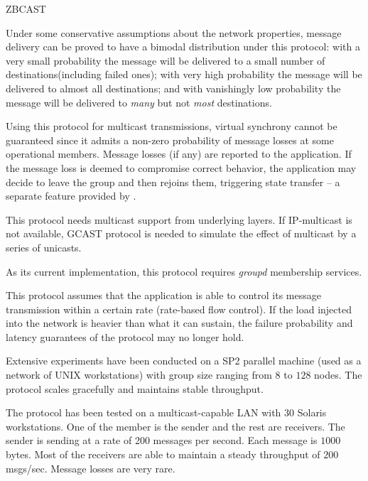 \begin{Layer}{ZBCAST}
\begin{Properties}
\item
Under some conservative assumptions about the network properties,
message delivery can be proved to have a bimodal distribution under
this protocol: with a very small probability the message will be
delivered to a small number of destinations(including failed ones);
with very high probability the message will be delivered to almost all
destinations; and with vanishingly low probability the message will be
delivered to \emph{many} but not \emph{most} destinations.

\item
Using this protocol for multicast transmissions, virtual synchrony
cannot be guaranteed since it admits a non-zero probability of message
losses at some operational members.  Message losses (if any) are
reported to the application.  If the message loss is deemed to
compromise correct behavior, the application may decide to leave the
group and then rejoins them, triggering state transfer -- a separate
feature provided by \ensemble.

\item
This protocol needs multicast support from underlying layers.  If
IP-multicast is not available, GCAST protocol is needed to simulate
the effect of multicast by a series of unicasts.

\item
As its current implementation, this protocol requires \emph{groupd}
membership services.

\item
This protocol assumes that the application is able to control its
message transmission within a certain rate (rate-based flow control).
If the load injected into the network is heavier than what it can
sustain, the failure probability and latency guarantees of the
protocol may no longer hold.
\end{Properties}

\begin{Sources}
\end{Sources}

\begin{GenEvent}
\genevent{\DnCast}
\genevent{\DnSend}
\genevent{\UpLostMessage}
\end{GenEvent}

\begin{Testing}
\item
Extensive experiments have been conducted on a SP2 parallel machine
(used as a network of UNIX workstations) with group size ranging from
$8$ to $128$ nodes.  The protocol scales gracefully and maintains
stable throughput.
\item
The protocol has been tested on a multicast-capable LAN with 30
Solaris workstations.  One of the member is the sender and the rest
are receivers.  The sender is sending at a rate of 200 messages per
second.  Each message is $1000$ bytes.  Most of the receivers are able
to maintain a steady throughput of $200$ msgs/sec.  Message losses are
very rare.


\end{Testing}
\end{Layer}
